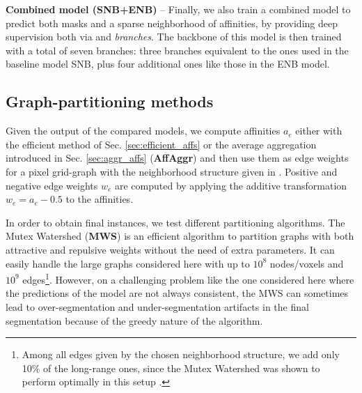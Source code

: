 \textbf{Combined model (SNB+ENB)} -- Finally, we also train a combined model to predict both \maskname masks and a sparse neighborhood of affinities, by providing deep supervision both via \emph{\encBr} and \emph{\sparseBr} \emph{branches}. The backbone of this model is then trained with a total of seven branches: three branches equivalent to the ones used in the baseline model SNB, plus four additional ones like those in the ENB model.  

\subsection{Graph-partitioning methods} 
Given the output of the compared models, we compute affinities $a_e$ either with the efficient method of Sec. \ref{sec:efficient_affs} or the average aggregation introduced in Sec. \ref{sec:aggr_affs} (\textbf{AffAggr}) and then use them as edge weights for a pixel grid-graph with the neighborhood structure given in . Positive and negative edge weights $w_e$ are computed by applying the additive transformation $w_e=a_e-0.5$ to the affinities.

In order to obtain final instances, we test different partitioning algorithms.
The Mutex Watershed (\textbf{MWS}) \cite{wolf2018mutex} is an efficient algorithm to partition graphs with both attractive and repulsive weights without the need of extra parameters. It can easily handle the large graphs considered here with up to $10^8$ nodes/voxels and $10^9$ edges\footnote{Among all edges given by the chosen neighborhood structure, we add only 10\% of the long-range ones, since the Mutex Watershed was shown to perform optimally in this setup \cite{bailoni2019generalized,wolf2018mutex}.}. However, on a challenging problem like the one considered here where the predictions of the model are not always consistent, the MWS can sometimes lead to over-segmentation and under-segmentation artifacts in the final segmentation because of the greedy nature of the algorithm.

